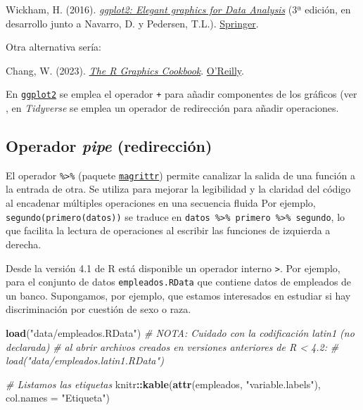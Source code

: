 \documentclass[
]{book}
\newenvironment{Shaded}{\begin{snugshade}}{\end{snugshade}}
\newcommand{\AttributeTok}[1]{\textcolor[rgb]{0.13,0.29,0.53}{#1}}
\newcommand{\CommentTok}[1]{\textcolor[rgb]{0.56,0.35,0.01}{\textit{#1}}}
\newcommand{\FunctionTok}[1]{\textcolor[rgb]{0.13,0.29,0.53}{\textbf{#1}}}
\newcommand{\NormalTok}[1]{#1}
\newcommand{\SpecialCharTok}[1]{\textcolor[rgb]{0.81,0.36,0.00}{\textbf{#1}}}
\newcommand{\StringTok}[1]{\textcolor[rgb]{0.31,0.60,0.02}{#1}}
\begin{document}
Wickham, H. (2016). \emph{\href{https://ggplot2-book.org}{ggplot2: Elegant graphics for Data Analysis}} (3ª edición, en desarrollo junto a Navarro, D. y Pedersen, T.L.). \href{https://www.amazon.com/gp/product/331924275X}{Springer}.

Otra alternativa sería:

Chang, W. (2023). \emph{\href{https://r-graphics.org}{The R Graphics Cookbook}}. \href{https://www.amazon.com/dp/1491978600}{O'Reilly}.

En \href{https://ggplot2.tidyverse.org}{\texttt{ggplot2}} se emplea el operador \texttt{+} para añadir componentes de los gráficos (ver , en \emph{Tidyverse} se emplea un operador de redirección para añadir operaciones.

\hypertarget{pipe}{%
\subsection{\texorpdfstring{Operador \emph{pipe} (redirección)}{Operador pipe (redirección)}}\label{pipe}}

El operador \texttt{\%\textgreater{}\%} (paquete \href{https://magrittr.tidyverse.org}{\texttt{magrittr}}) permite canalizar la salida de una función a la entrada de otra. Se utiliza para mejorar la legibilidad y la claridad del código al encadenar múltiples operaciones en una secuencia fluida
Por ejemplo, \texttt{segundo(primero(datos))} se traduce en \texttt{datos\ \%\textgreater{}\%\ primero\ \%\textgreater{}\%\ segundo}, lo que facilita la lectura de operaciones al escribir las funciones de izquierda a derecha.

Desde la versión 4.1 de R está disponible un operador interno \texttt{\textbar{}\textgreater{}}.
Por ejemplo, para el conjunto de datos \texttt{empleados.RData} que contiene datos de empleados de un banco. Supongamos, por ejemplo, que estamos interesados en estudiar si hay discriminación por cuestión de sexo o raza.

\begin{Shaded}
\begin{Highlighting}[]
\FunctionTok{load}\NormalTok{(}\StringTok{"data/empleados.RData"}\NormalTok{)}
\CommentTok{\# NOTA: Cuidado con la codificación latin1 (no declarada) }
\CommentTok{\# al abrir archivos creados en versiones anteriores de R \textless{} 4.2: }
\CommentTok{\# load("data/empleados.latin1.RData")}

\CommentTok{\# Listamos las etiquetas}
\NormalTok{knitr}\SpecialCharTok{::}\FunctionTok{kable}\NormalTok{(}\FunctionTok{attr}\NormalTok{(empleados, }\StringTok{"variable.labels"}\NormalTok{),}
             \AttributeTok{col.names =} \StringTok{"Etiqueta"}\NormalTok{)}
\end{Highlighting}
\end{Shaded}
\end{document}
